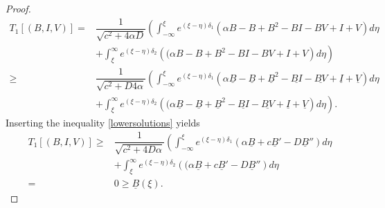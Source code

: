\documentclass[11pt]{article}
\theoremstyle{definition}
\begin{document}
{\begin{proof}
\begin{align}
        T_1[(B,I,V)] = &\dfrac{1}{\sqrt{c^2+4 \alpha D}} \left( \int_{-\infty}^{\xi} e^{(\xi- \eta)\delta_1} {\left(\alpha {B}-{B}+{B^2}-{BI}-{BV}+I+V \right)}d \eta \right.\\ & \left. +\int_{\xi}^{\infty} e^{(\xi- \eta)\delta_2} {\left((\alpha {B}-{B}+{B^2}-{BI}-{BV}+I+V\right)}d \eta \right)\\ 
      \geq &\dfrac{1}{\sqrt{c^2+D4 \alpha}} \left( \int_{-\infty}^{\xi} e^{(\xi- \eta)\delta_1} {\left(\alpha \underline{B}-\underline{B}+\underline{B}^2-\underline{BI}-\underline{BV} +\underline{I}+\underline{V}\right)}d \eta \right. \\ &\left.  +\int_{\xi}^{\infty} e^{(\xi- \eta)\delta_2} {\left((\alpha \underline{B}-\underline{B}+\underline{B}^2-\underline{BI}-\underline{BV} +\underline{I}+\underline{V}\right)}d \eta \right).
    \end{align}
Inserting the inequality \eqref{lowersolutions} yields 
  \begin{align}
          T_1[(B,I,V)] \geq & \dfrac{1}{\sqrt{c^2+4D \alpha}} \left( \int_{-\infty}^{\xi} e^{(\xi- \eta)\delta_1} {\left(\alpha \underline{B}+ c\underline{B}'-D\underline{B}'' \right)}d \eta \right. \\ & + \left. \int_{\xi}^{\infty} e^{(\xi- \eta)\delta_2} {\left((\alpha \underline{B}+ c\underline{B}'-D\underline{B}'' \right)}d \eta \right.\\ =& 0\ge\underline{B}(\xi).
    \end{align}


\end{proof}}
\end{document}
